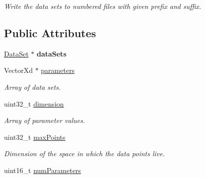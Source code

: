 \begin{DoxyCompactItemize}
\begin{DoxyCompactList}\small\item\em Write the data sets to numbered files with given prefix and suffix. \end{DoxyCompactList}\end{DoxyCompactItemize}
\subsection*{Public Attributes}
\begin{DoxyCompactItemize}
\item 
\hypertarget{struct_d_r_d_s_p_1_1_data_system_a67957644fe1a286de4d9ad2dec06b972}{\hyperlink{struct_d_r_d_s_p_1_1_data_set}{Data\-Set} $\ast$ {\bfseries data\-Sets}}\label{struct_d_r_d_s_p_1_1_data_system_a67957644fe1a286de4d9ad2dec06b972}

\item 
\hypertarget{struct_d_r_d_s_p_1_1_data_system_adfbfe0987e15a40aa9a39987937ca337}{Vector\-Xd $\ast$ \hyperlink{struct_d_r_d_s_p_1_1_data_system_adfbfe0987e15a40aa9a39987937ca337}{parameters}}\label{struct_d_r_d_s_p_1_1_data_system_adfbfe0987e15a40aa9a39987937ca337}

\begin{DoxyCompactList}\small\item\em Array of data sets. \end{DoxyCompactList}\item 
\hypertarget{struct_d_r_d_s_p_1_1_data_system_ab6aefaa08cd0a5b6a9e83105ecd56289}{uint32\-\_\-t \hyperlink{struct_d_r_d_s_p_1_1_data_system_ab6aefaa08cd0a5b6a9e83105ecd56289}{dimension}}\label{struct_d_r_d_s_p_1_1_data_system_ab6aefaa08cd0a5b6a9e83105ecd56289}

\begin{DoxyCompactList}\small\item\em Array of parameter values. \end{DoxyCompactList}\item 
\hypertarget{struct_d_r_d_s_p_1_1_data_system_a3e5fe0e180799a6251dfd66b4a2cd49c}{uint32\-\_\-t \hyperlink{struct_d_r_d_s_p_1_1_data_system_a3e5fe0e180799a6251dfd66b4a2cd49c}{max\-Points}}\label{struct_d_r_d_s_p_1_1_data_system_a3e5fe0e180799a6251dfd66b4a2cd49c}

\begin{DoxyCompactList}\small\item\em Dimension of the space in which the data points live. \end{DoxyCompactList}\item 
\hypertarget{struct_d_r_d_s_p_1_1_data_system_ab6c8c9e69467d53990254ecdcbf5e073}{uint16\-\_\-t \hyperlink{struct_d_r_d_s_p_1_1_data_system_ab6c8c9e69467d53990254ecdcbf5e073}{num\-Parameters}}\label{struct_d_r_d_s_p_1_1_data_system_ab6c8c9e69467d53990254ecdcbf5e073}


\end{DoxyCompactItemize}
